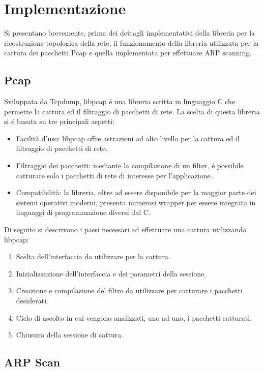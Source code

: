 \section{Implementazione}
Si presentano brevemente, prima dei dettagli implementativi della libreria per la ricostruzione topologica della rete, il funzionamento della libreria utilizzata per la cattura dei pacchetti Pcap e quella implementata per effettuare ARP scanning.
\subsection{Pcap}

Sviluppata da Tcpdump, libpcap  \'e una libreria scritta in linguaggio C che permette la cattura ed il filtraggio di pacchetti di rete.
La scelta di questa libreria si \'e basata su tre principali aspetti:
\begin{itemize}
	\item Facilit\`a d'uso: libpcap offre astrazioni ad alto livello per la cattura ed il filtraggio di pacchetti di rete.
	\item Filtraggio dei pacchetti: mediante la compilazione di un filter, \'e possibile catturare solo i pacchetti di rete di interesse per l'applicazione.  
	\item Compatibilit\`a: la libreria, oltre ad essere disponibile per la maggior parte dei sistemi operativi moderni, presenta numerosi wrapper per essere integrata in linguaggi di programmazione diversi dal C.
\end{itemize}
Di seguito si descrivono i passi necessari ad effettuare una cattura utilizzando libpcap:
\begin{enumerate}
	\item Scelta dell'interfaccia da utilizzare per la cattura.
	\item Inizializzazione dell'interfaccia e dei parametri della sessione.
	\item Creazione e compilazione del filtro da utilizzare per catturare i pacchetti desiderati. 
	\item Ciclo di ascolto in cui vengono analizzati, uno ad uno, i pacchetti catturati.
	\item Chiusura della sessione di cattura.
\end{enumerate}


\subsection{ARP Scan}

